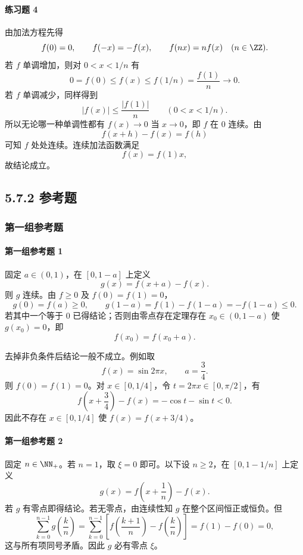 \paragraph{练习题 4}
\begin{xsolution}
由加法方程先得
\[
 f(0)=0,
 \qquad f(-x)=-f(x),
 \qquad f(nx)=nf(x)\quad(n\in\ZZ).
\]
若 $f$ 单调增加，则对 $0<x<1/n$ 有
\[
 0=f(0)\le f(x)\le f(1/n)=\frac{f(1)}n\to0.
\]
若 $f$ 单调减少，同样得到
\[
 |f(x)|\le\frac{|f(1)|}{n}\qquad(0<x<1/n).
\]
所以无论哪一种单调性都有 $f(x)\to0$ 当 $x\to0$，即 $f$ 在 $0$ 连续。由
\[
 f(x+h)-f(x)=f(h)
\]
可知 $f$ 处处连续。连续加法函数满足
\[
 f(x)=f(1)x,
\]
故结论成立。
\end{xsolution}


\subsection*{5.7.2 参考题}

\subsubsection*{第一组参考题}

\paragraph{第一组参考题 1}
\begin{xsolution}
固定 $a\in(0,1)$，在 $[0,1-a]$ 上定义
\[
 g(x)=f(x+a)-f(x).
\]
则 $g$ 连续。由 $f\ge0$ 及 $f(0)=f(1)=0$，
\[
 g(0)=f(a)\ge0,
 \qquad
 g(1-a)=f(1)-f(1-a)=-f(1-a)\le0.
\]
若其中一个等于 $0$ 已得结论；否则由零点存在定理存在 $x_0\in(0,1-a)$ 使 $g(x_0)=0$，即
\[
 f(x_0)=f(x_0+a).
\]

去掉非负条件后结论一般不成立。例如取
\[
 f(x)=\sin2\pi x,
 \qquad a=\frac34.
\]
则 $f(0)=f(1)=0$。对 $x\in[0,1/4]$，令 $t=2\pi x\in[0,\pi/2]$，有
\[
 f\left(x+\frac34\right)-f(x)
 =-\cos t-\sin t<0.
\]
因此不存在 $x\in[0,1/4]$ 使 $f(x)=f(x+3/4)$。
\end{xsolution}

\paragraph{第一组参考题 2}
\begin{xsolution}
固定 $n\in\NN_+$。若 $n=1$，取 $\xi=0$ 即可。以下设 $n\ge2$，在 $[0,1-1/n]$ 上定义
\[
 g(x)=f\left(x+\frac1n\right)-f(x).
\]
若 $g$ 有零点即得结论。若无零点，由连续性知 $g$ 在整个区间恒正或恒负。但
\[
 \sum_{k=0}^{n-1}g\left(\frac{k}{n}\right)
 =\sum_{k=0}^{n-1}
 \left[f\left(\frac{k+1}{n}\right)-f\left(\frac{k}{n}\right)\right]
 =f(1)-f(0)=0,
\]
这与所有项同号矛盾。因此 $g$ 必有零点 $\xi$。
\end{xsolution}

